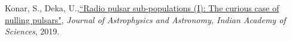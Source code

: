 \begin{itemize}[noitemsep]
{
\item Konar, S., Deka, U.,\href{https://www.ias.ac.in/article/fulltext/joaa/040/05/0042}{``Radio pulsar sub-populations (I): The curious case of nulling pulsars"}, \textit{Journal of Astrophysics and Astronomy, Indian Academy of Sciences}, 2019.
}\end{itemize}